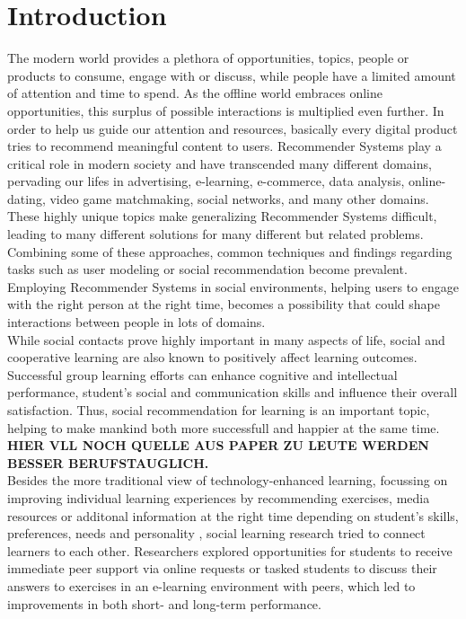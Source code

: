 \documentclass[conference]{IEEEtran}
\begin{document}
\section{Introduction}
The modern world provides a plethora of opportunities, topics, people or products to consume, engage with or discuss, while people have a limited amount of attention and time to spend. As the offline world embraces online opportunities, this surplus of possible interactions is multiplied even further. In order to help us guide our attention and resources, basically every digital product tries to recommend meaningful content to users. Recommender Systems play a critical role in modern society and have transcended many different domains, pervading our lifes in advertising, e-learning, e-commerce, data analysis, online-dating, video game matchmaking, social networks, and many other domains.\\
These highly unique topics make generalizing Recommender Systems difficult, leading to many different solutions for many different but related problems. Combining some of these approaches, common techniques and findings regarding tasks such as user modeling or social recommendation become prevalent. Employing Recommender Systems in social environments, helping users to engage with the right person at the right time, becomes a possibility that could shape interactions between people in lots of domains.\\ 
While social contacts prove highly important in many aspects of life, social and cooperative learning are also known to positively affect learning outcomes. \cite{bossert1982instructional, blumenfeld1996learning} Successful group learning efforts can enhance cognitive and intellectual performance, student's social and communication skills and influence their overall satisfaction. \cite{zhao2004adding, maxwell2008learning} Thus, social recommendation for learning is an important topic, helping to make mankind both more successfull and happier at the same time. \textbf{HIER VLL NOCH QUELLE AUS PAPER ZU LEUTE WERDEN BESSER BERUFSTAUGLICH.}\\
Besides the more traditional view of technology-enhanced learning, focussing on improving individual learning experiences by recommending exercises, media resources or additonal information at the right time depending on student's skills, preferences, needs and personality \cite{drachsler2015panorama, erdt2015evaluating}, social learning research tried to connect learners to each other. Researchers explored opportunities for students to receive immediate peer support via online requests \cite{greer1998intelligent} or tasked students to discuss their answers to exercises in an e-learning environment with peers, which led to improvements in both short- and long-term performance. \cite{reidsema2016exploring}\\
\end{document}
